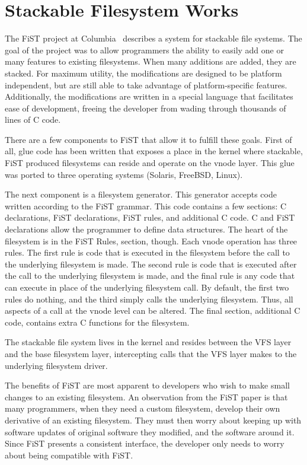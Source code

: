 \section{Stackable Filesystem Works}

The FiST project at Columbia~\cite{zadok00fist}
describes a system for stackable file
systems. The goal of the project was to allow programmers the ability
to easily add one or many features to existing filesystems. When many
additions are added, they are stacked. For maximum utility, the
modifications are designed to be platform independent, but are still
able to take advantage of platform-specific features. Additionally,
the modifications are written in a special language that facilitates
ease of development, freeing the developer from wading through
thousands of lines of C code.

There are a few components to FiST that allow it to fulfill these
goals. First of all, glue code has been written that exposes a place
in the kernel where stackable, FiST produced filesystems can reside
and operate on the vnode layer. This glue was ported to three
operating systems (Solaris, FreeBSD, Linux).

The next component is a filesystem generator. This generator accepts
code written according to the FiST grammar. This code contains a few
sections: C declarations, FiST declarations, FiST rules, and
additional C code. C and FiST declarations allow the programmer to
define data structures. The heart of the filesystem is in the FiST
Rules, section, though. Each vnode operation has three rules. The
first rule is code that is executed in the filesystem before the call
to the underlying filesystem is made. The second rule is code that is
executed after the call to the underlying filesystem is made, and the
final rule is any code that can execute in place of the underlying
filesystem call. By default, the first two rules do nothing, and the
third simply calls the underlying filesystem. Thus, all aspects of a
call at the vnode level can be altered. The final section, additional
C code, contains extra C functions for the filesystem.

The stackable file system lives in the kernel and resides between the
VFS layer and the base filesystem layer, intercepting calls that the
VFS layer makes to the underlying filesystem driver.

The benefits of FiST are most apparent to developers who wish to make
small changes to an existing filesystem. An observation from the FiST
paper is that many programmers, when they need a custom filesystem,
develop their own derivative of an existing filesystem. They must then
worry about keeping up with software updates of original software they
modified, and the software around it. Since FiST presents a consistent
interface, the developer only needs to worry about being compatible
with FiST.

